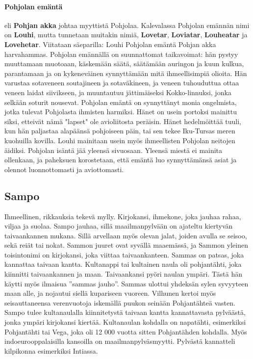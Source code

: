   \paragraph{Pohjolan emäntä} eli \textbf{Pohjan akka} johtaa myyttistä Pohjolaa. Kalevalassa 
  Pohjolan emännän nimi on \textbf{Louhi}, mutta tunnetaan muitakin nimiä, \textbf{Lovetar}, 
  \textbf{Loviatar}, \textbf{Louheatar} ja \textbf{Lovehetar}. Viitataan säeparilla: Louhi 
  Pohjolan emäntä Pohjan akka harvahammas. Pohjolan emännällä on suunnattomat taikavoimat: hän 
  pystyy muuttamaan muotoaan, käskemään säätä, säätämään auringon ja kuun kulkua, parantamaan 
  ja on kykeneväinen synnyttämään mitä ihmeellisimpiä olioita. Hän varustaa sotaveneen soutajineen 
  ja sotaväkineen, ja veneen tuhouduttua ottaa veneen laidat siivikseen, ja muuntautuu 
  jättimäiseksi Kokko-linnuksi, jonka selkään soturit nousevat. Pohjolan emäntä on synnyttänyt 
  monia ongelmista, jotka tulevat Pohjolasta ihmisten harmiksi. Hänet on usein portoksi mainittu 
  siksi, etteivät nämä "lapset" ole avioliitosta peräisin. Hänet hedelmöittää tuuli, kun hän 
  paljastaa alapäänsä pohjoiseen päin, tai sen tekee Iku-Tursas meren kuohuilla kovilla. Louhi 
  mainitaan usein myös ihmeellisten Pohjolan neitojen äidiksi. Pohjolan isäntä jää yleensä 
  sivuosaan. Yleensä miestä ei mainita ollenkaan, ja paheksuen korostetaan, että emäntä luo 
  synnyttämänsä asiat ja olennot luonnottomasti ja aviottomasti. 
 


\subsection{Sampo} 
  Ihmeellinen, rikkauksia tekevä mylly. Kirjokansi, ihmekone, joka jauhaa rahaa, viljaa ja 
  suolaa. Sampo jauhaa, sillä maailmanpylvään on ajateltu kiertyvän taivaankannen mukana. Sillä 
  arvellaan myös olevan jalat, joiden avulla se seisoo, sekä reiät tai nokat. Sammon juuret ovat 
  syvällä maaemässä, ja Sammon yleinen toisintonimi on kirjokansi, joka viittaa taivaankanteen. 
  Sammas on patsas, joka kannattaa taivaan kantta. Kultanappi tai kultainen naula oli pohjantähti, 
  joka kiinnitti taivaankannen ja maan. Taivaankansi pyöri naulan ympäri. Tästä hän käytti myös 
  ilmaisua ”sammas jauho”. Sammas ulottui yhdeksän sylen syvyyteen maan alle, ja nojautui siellä 
  kupariseen vuoreen. Vilhunen kertoi myös seisauttaneensa verenvuotoja iskemällä puukon seinään 
  Pohjantähteä vasten. Sampo tulee kultanaulalla kiinnitetystä taivaan kantta kannattavasta 
  pylväästä, jonka ympäri kirjokansi kiertää. Kultanaulan kohdalla on napatähti, esimerkiksi 
  Pohjantähti tai Vega, joka oli 12 000 vuotta sitten Pohjantähden kohdalla. Myös 
  indoeurooppalaisilla kansoilla on maailmanpylväsmyytti. Pylvästä kannatteli kilpikonna 
  esimerkiksi Intiassa.

